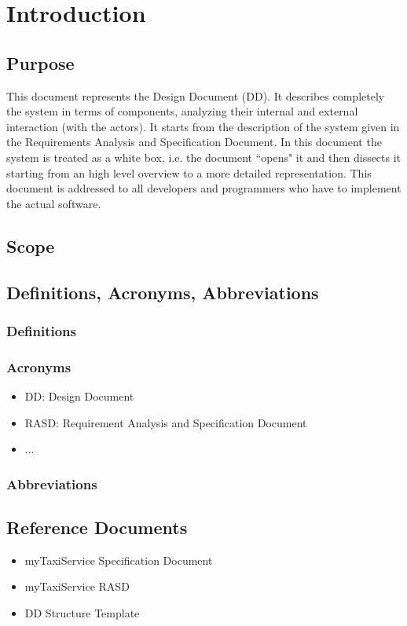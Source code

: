 \section{Introduction}
\subsection{Purpose}
This document represents the Design Document (DD). It describes completely the system in terms of components, analyzing their internal and external interaction (with the actors). It starts from the description of the system given in the Requirements Analysis and Specification Document. In this document the system is treated as a white box, i.e. the document ``opens" it and then dissects it starting from an high level overview to a more detailed representation. This document is addressed to all developers and programmers who have to implement the actual software.
\subsection{Scope}
\subsection{Definitions, Acronyms, Abbreviations}
\subsubsection{Definitions}
\subsubsection{Acronyms}
\begin{itemize}
	\item DD: Design Document
	\item RASD: Requirement Analysis and Specification Document
	\item ...
\end{itemize}
\subsubsection{Abbreviations}
\subsection{Reference Documents}
\begin{itemize}
	\item myTaxiService Specification Document
	\item myTaxiService RASD
	\item DD Structure Template
\end{itemize}
